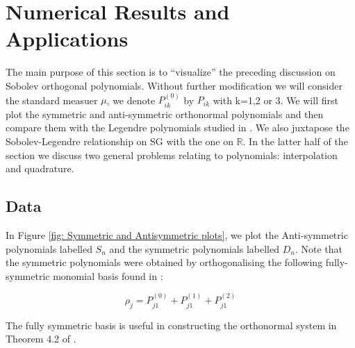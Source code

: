 \documentclass[12pt]{amsart}
\theoremstyle{plain}
\theoremstyle{definition}
\newcommand{\RR}{\mathbb{R}}
\begin{document}
\section{Numerical Results and Applications}

The main purpose of this section is to ``visualize'' the preceding discussion on Sobolev orthogonal polynomials. Without further modification we will consider the standard measuer $\mu$, we denote $P^{(0)}_{ik}$ by $P_{ik}$ with k=1,2 or 3. We will first plot the symmetric and anti-symmetric orthonormal polynomials and then compare them with the Legendre polynomials studied in \cite{OST}. We also juxtapose the Sobolev-Legendre relationship on SG with the one on $\RR$. In the latter half of the section we discuss two general problems relating to polynomials: interpolation and quadrature.

\subsection{Data}

In Figure \ref{fig: Symmetric and Antisymmetric plots}, we plot the Anti-symmetric polynomials labelled $S_n$ and the symmetric polynomials labelled $D_n$. Note that the symmetric polynomials were obtained by orthogonalising the following fully-symmetric monomial basis found in \cite{OST}: 

$$ \rho_{j} = P_{j1}^{(0)} + P_{j1}^{(1)} + P_{j1}^{(2)}$$

The fully symmetric basis is useful in constructing the orthonormal system in Theorem 4.2 of \cite{OST}. 
\end{document}
